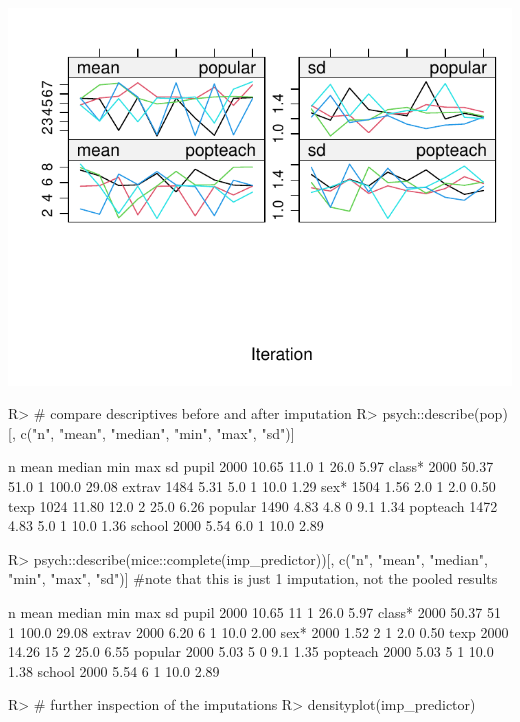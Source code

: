 \documentclass[
]{jss}
\begin{document}
\begin{CodeChunk}
\begin{center}\includegraphics{Manuscript_files/figure-latex/pop-predictor-2} \end{center}

\begin{CodeInput}
R> # compare descriptives before and after imputation
R> psych::describe(pop)[, c("n", "mean", "median", "min", "max", "sd")]
\end{CodeInput}
\begin{CodeOutput}
            n  mean median min   max    sd
pupil    2000 10.65   11.0   1  26.0  5.97
class*   2000 50.37   51.0   1 100.0 29.08
extrav   1484  5.31    5.0   1  10.0  1.29
sex*     1504  1.56    2.0   1   2.0  0.50
texp     1024 11.80   12.0   2  25.0  6.26
popular  1490  4.83    4.8   0   9.1  1.34
popteach 1472  4.83    5.0   1  10.0  1.36
school   2000  5.54    6.0   1  10.0  2.89
\end{CodeOutput}
\begin{CodeInput}
R> psych::describe(mice::complete(imp_predictor))[, c("n", "mean", "median", "min", "max", "sd")] #note that this is just 1 imputation, not the pooled results
\end{CodeInput}
\begin{CodeOutput}
            n  mean median min   max    sd
pupil    2000 10.65     11   1  26.0  5.97
class*   2000 50.37     51   1 100.0 29.08
extrav   2000  6.20      6   1  10.0  2.00
sex*     2000  1.52      2   1   2.0  0.50
texp     2000 14.26     15   2  25.0  6.55
popular  2000  5.03      5   0   9.1  1.35
popteach 2000  5.03      5   1  10.0  1.38
school   2000  5.54      6   1  10.0  2.89
\end{CodeOutput}
\begin{CodeInput}
R> # further inspection of the imputations
R> densityplot(imp_predictor)
\end{CodeInput}



\end{CodeChunk}
\end{document}
